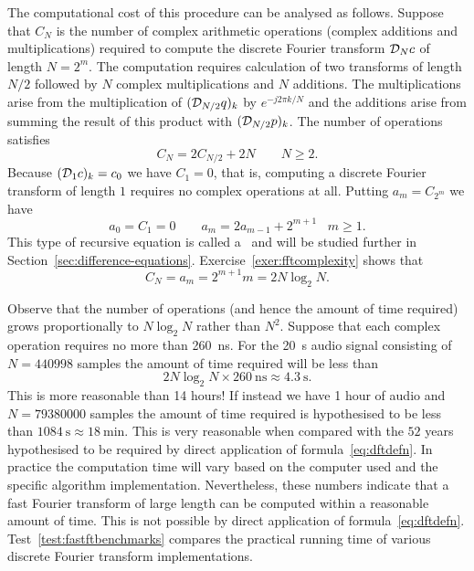 The computational cost of this procedure can be analysed as follows.  Suppose that $C_N$ is the number of complex arithmetic operations (complex additions and multiplications) required to compute the discrete Fourier transform ${\mathcal D}_N c$ of length $N = 2^m$.  The computation requires calculation of two transforms of length $N/2$ followed by $N$ complex multiplications and $N$ additions.  The multiplications arise from the multiplication of $({\mathcal D}_{N/2}q)_k$ by $e^{-j 2\pi k / N}$ and the additions arise from summing the result of this product with $({\mathcal D}_{N/2}p)_k$.  The number of operations satisfies
\[
C_N = 2C_{N/2} + 2N \qquad N \geq 2.
\]
Because $({\mathcal D}_1 c)_k = c_0$ we have $C_1 = 0$, that is, computing a discrete Fourier transform of length $1$ requires no complex operations at all.  Putting $a_m = C_{2^m}$ we have
\begin{equation}\label{eq:recursiveeqcomplexityfft}
a_0 = C_1 = 0 \qquad a_m = 2 a_{m-1} + 2^{m+1} \;\;\; m \geq 1.
\end{equation}
This type of recursive equation is called a~ and will be studied further in Section~\ref{sec:difference-equations}.  %
Exercise~\ref{exer:fftcomplexity} shows that
\[
C_{N} = a_{m} = 2^{m+1}m = 2N\log_2 N.
\]

Observe that the number of operations (and hence the amount of time required) grows proportionally to $N\log_2 N$ rather than $N^2$.  Suppose that each complex operation requires no more than \SI{260}{\nano\second}.  For the \SI{20}{\second} audio signal consisting of $N = 440998$ samples the amount of time required will be less than
\begin{equation}\label{eq:runtimefftcooleytukeyapprox}
2N \log_2 N \times \SI{260}{\nano\second} \approx \SI{4.3}{\second}.
\end{equation} 
This is more reasonable than 14 hours!  If instead we have 1 hour of audio and $N = 79380000$ samples the amount of time required is hypothesised to be less than $\SI{1084}{\second} \approx \SI{18}{\minute}$.  This is very reasonable when compared with the $52$ years hypothesised to be required by direct application of formula~\eqref{eq:dftdefn}.  In practice the computation time will vary based on the computer used and the specific algorithm implementation.  Nevertheless, these numbers indicate that a fast Fourier transform of large length can be computed within a reasonable amount of time.  This is not possible by direct application of formula~\eqref{eq:dftdefn}.  Test~\ref{test:fastftbenchmarks} compares the practical running time of various discrete Fourier transform implementations.

